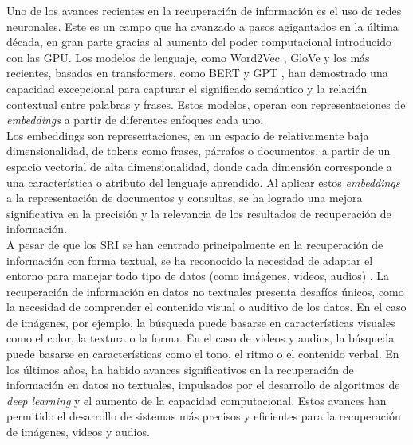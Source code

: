 Uno de los avances recientes en la recuperación de información es el uso de redes neuronales. Este es un campo que ha avanzado a pasos agigantados en la última década, en gran parte gracias al aumento del poder computacional introducido con las GPU. Los modelos de lenguaje, como Word2Vec \cite{Mikolov2013EfficientEO}, GloVe \cite{Pennington2014GloVeGV} y los más recientes, basados en transformers, como BERT \cite{Devlin2019BERTPO} y GPT \cite{Radford2018ImprovingLU}, han demostrado una capacidad excepcional para capturar el significado semántico y la relación contextual entre palabras y frases. Estos modelos, operan con representaciones de \textit{embeddings} a partir de diferentes enfoques cada uno.\\
Los embeddings son representaciones, en un espacio de relativamente baja dimensionalidad, de tokens como frases, párrafos o documentos, a partir de un espacio vectorial de alta dimensionalidad, donde cada dimensión corresponde a una característica o atributo del lenguaje aprendido. Al aplicar estos \textit{embeddings} a la representación de documentos y consultas, se ha logrado una mejora significativa en la precisión y la relevancia de los resultados de recuperación de información.\\ %

A pesar de que los SRI se han centrado principalmente en la recuperación de información con forma textual, se ha reconocido la necesidad de adaptar el entorno para manejar todo tipo de datos (como imágenes, videos, audios) \cite{JianMMIR}. La recuperación de información en datos no textuales presenta desafíos únicos, como la necesidad de comprender el contenido visual o auditivo de los datos. En el caso de imágenes, por ejemplo, la búsqueda puede basarse en características visuales como el color, la textura o la forma. En el caso de videos y audios, la búsqueda puede basarse en características como el tono, el ritmo o el contenido verbal. En los últimos años, ha habido avances significativos en la recuperación de información en datos no textuales, impulsados por el desarrollo de algoritmos de \textit{deep learning} y el aumento de la capacidad computacional. %
 Estos avances han permitido el desarrollo de sistemas más precisos y eficientes para la recuperación de imágenes, videos y audios.\\


